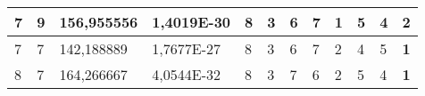 \documentclass[conference]{IEEEtran}
\begin{document}
\begin{table*}[]
\begin{tabular}{|llll|llllllll|}
\multicolumn{1}{|l|}{7}                                                     & \multicolumn{1}{l|}{9}                                                        & \multicolumn{1}{l|}{156,955556}                                                   & 1,4019E-30                     & \multicolumn{1}{l|}{8}                                                  & \multicolumn{1}{l|}{3}                                                  & \multicolumn{1}{l|}{6}                                                  & \multicolumn{1}{l|}{7}                                                  & \multicolumn{1}{l|}{\textbf{1}}                                         & \multicolumn{1}{l|}{5}                                                  & \multicolumn{1}{l|}{4}                                                  & 2                          \\ \hline
\multicolumn{1}{|l|}{7}                                                     & \multicolumn{1}{l|}{7}                                                        & \multicolumn{1}{l|}{142,188889}                                                   & 1,7677E-27                     & \multicolumn{1}{l|}{8}                                                  & \multicolumn{1}{l|}{3}                                                  & \multicolumn{1}{l|}{6}                                                  & \multicolumn{1}{l|}{7}                                                  & \multicolumn{1}{l|}{2}                                                  & \multicolumn{1}{l|}{4}                                                  & \multicolumn{1}{l|}{5}                                                  & \textbf{1}                 \\ \hline
\multicolumn{1}{|l|}{8}                                                     & \multicolumn{1}{l|}{7}                                                        & \multicolumn{1}{l|}{164,266667}                                                   & 4,0544E-32                     & \multicolumn{1}{l|}{8}                                                  & \multicolumn{1}{l|}{3}                                                  & \multicolumn{1}{l|}{7}                                                  & \multicolumn{1}{l|}{6}                                                  & \multicolumn{1}{l|}{2}                                                  & \multicolumn{1}{l|}{5}                                                  & \multicolumn{1}{l|}{4}                                                  & \textbf{1}                 \\ \hline

\end{tabular}
\end{table*}
\end{document}
